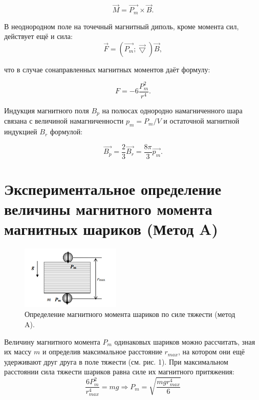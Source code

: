 \documentclass[a4paper, 14pt]{extarticle}%
\newcommand\ECaption[1]{%
     \captionsetup{font=footnotesize}%
     \caption{#1}}
\begin{document}
\begin{equation}
\vec{M} = \vec{P_m} \times \vec{B}.
\end{equation}

В неоднородном поле на точечный магнитный диполь, кроме момента сил, действует ещё и сила:
\begin{equation}
\vec{F} = (\vec{P_m};\vec{\bigtriangledown})\vec{B},
\end{equation}

что в случае сонаправленных магнитных моментов даёт формулу:

\begin{equation}
F = -6\frac{P_m^2}{r^4}.
\end{equation}

Индукция магнитного поля $B_p$ на полюсах однородно намагниченного шара связана с величиной намагниченности $p_m = P_m/V$
и остаточной магнитной индукцией $B_r$
формулой:

\[\vec{B_p} = \frac{2}{3} \vec{B_r} = \frac{8\pi}{3} \vec{p_m} .\]

\section{Экспериментальное определение величины магнитного момента магнитных шариков (Метод A)}

\begin{figure}
\begin{center}
\includegraphics[height=3cm]{pics/teorA.png}
\end{center}
\ECaption{Определение магнитного момента шариков по
силе тяжести (метод A).}
\end{figure}

Величину магнитного момента $P_m$ одинаковых шариков
можно рассчитать, зная их массу $m$ и определив максимальное расстояние $r_{max}$, на котором они ещё удерживают друг
друга в поле тяжести (см. рис. 1). При максимальном расстоянии сила тяжести шариков равна силе их магнитного притяжения:
\begin{equation}
\dfrac{6P_m^2}{r_{max}^4} = mg \Longrightarrow P_m = \sqrt{\dfrac{mgr_{max}^4}{6}}
\end{equation}
\end{document}
